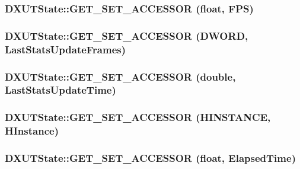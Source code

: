 \label{class_d_x_u_t_state_acecf3e26898c43cf90661b119dd6aa63}
\hypertarget{class_d_x_u_t_state_accc97e39d9e6ed9d7bf119742bc80a33}{
\subsubsection[{GET\_\-SET\_\-ACCESSOR}]{\setlength{\rightskip}{0pt plus 5cm}DXUTState::GET\_\-SET\_\-ACCESSOR (float, \/  FPS)}}
\label{class_d_x_u_t_state_accc97e39d9e6ed9d7bf119742bc80a33}
\hypertarget{class_d_x_u_t_state_ac41d64d5d6c5e2e4581d7691de699813}{
\subsubsection[{GET\_\-SET\_\-ACCESSOR}]{\setlength{\rightskip}{0pt plus 5cm}DXUTState::GET\_\-SET\_\-ACCESSOR (DWORD, \/  LastStatsUpdateFrames)}}
\label{class_d_x_u_t_state_ac41d64d5d6c5e2e4581d7691de699813}
\hypertarget{class_d_x_u_t_state_abaf158a9b3da0ca285351bc1734ce0bc}{
\subsubsection[{GET\_\-SET\_\-ACCESSOR}]{\setlength{\rightskip}{0pt plus 5cm}DXUTState::GET\_\-SET\_\-ACCESSOR (double, \/  LastStatsUpdateTime)}}
\label{class_d_x_u_t_state_abaf158a9b3da0ca285351bc1734ce0bc}
\hypertarget{class_d_x_u_t_state_a120cbee424cd8d4027ccb673a54dac45}{
\subsubsection[{GET\_\-SET\_\-ACCESSOR}]{\setlength{\rightskip}{0pt plus 5cm}DXUTState::GET\_\-SET\_\-ACCESSOR (HINSTANCE, \/  HInstance)}}
\label{class_d_x_u_t_state_a120cbee424cd8d4027ccb673a54dac45}
\hypertarget{class_d_x_u_t_state_a648316ed44cdbdbe6b7e4e7edb4baf84}{
\subsubsection[{GET\_\-SET\_\-ACCESSOR}]{\setlength{\rightskip}{0pt plus 5cm}DXUTState::GET\_\-SET\_\-ACCESSOR (float, \/  ElapsedTime)}}
